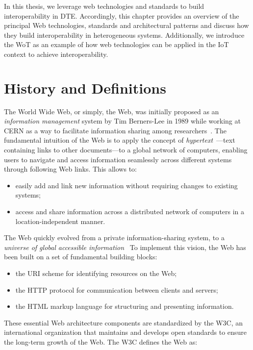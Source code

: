 In this thesis, we leverage web technologies and standards to build interoperability in \ac{DTE}. 
Accordingly, this chapter provides an overview of the principal Web technologies, standards and architectural patterns and discuss how they build interoperability in heterogeneous systems. 
%
Additionally, we introduce the \ac{WoT} as an example of how web technologies can be applied in the \ac{IoT} context to achieve interoperability. 


\section{History and Definitions}


The World Wide Web, or simply, the Web, was initially proposed as an \emph{information management} system by Tim Berners-Lee in 1989 while working at CERN as a way to facilitate information sharing among researchers~\cite{berners1989information,Gillies_Cailliau_2000}.
%
The fundamental intuition of the Web is to apply the concept of \emph{hypertext}~\cite{nelson1967getting}---text containing links to other documents---to a global network of computers, enabling users to navigate and access information seamlessly across different systems through following Web links.
%
This allows to: 
\begin{itemize}
    \item easily add and link new information without requiring changes to existing systems;
    \item access and share information across a distributed network of computers in a location-independent manner.
\end{itemize}

The Web quickly evolved from a private information-sharing system, to a \emph{universe of global accessible information}~\cite{Berners-Lee_1996}
%
To implement this vision, the Web has been built on a set of fundamental building blocks: 
\begin{itemize}
    \item the \ac{URI} scheme for identifying resources on the Web;
    \item the \ac{HTTP} protocol for communication between clients and servers;
    \item the \ac{HTML} markup language for structuring and presenting information.
\end{itemize}
These essential Web architecture components are standardized by the \ac{W3C}, an international organization that maintains and develops open standards to ensure the long-term growth of the Web. The \ac{W3C} defines the Web as:

